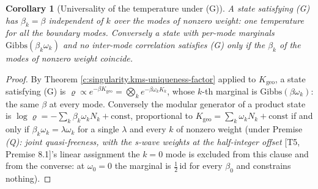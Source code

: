 \documentclass[11pt]{article}
\newtheorem{corollary}[theorem]{Corollary}
\theoremstyle{definition}
\theoremstyle{plain}
\begin{document}
\begin{corollary}[Universality of the temperature under (G)]\label{c:singularity.universality-temperature-under-g}
A state satisfying (G) has $\beta_k = \beta$ independent of $k$ over the modes of nonzero weight: one temperature for all the boundary modes. Conversely a state with per-mode marginals $\mathrm{Gibbs}(\beta_k\omega_k)$ and no inter-mode correlation satisfies (G) only if the $\beta_k$ of the modes of nonzero weight coincide.
\end{corollary}
\begin{proof}
By Theorem \ref{c:singularity.kms-uniqueness-factor} applied to $K_{\mathrm{geo}}$, a state satisfying (G) is $\varrho \propto e^{-\beta K_{\mathrm{geo}}} = \bigotimes_k e^{-\beta\omega_k K_k}$, whose $k$-th marginal is $\mathrm{Gibbs}(\beta\omega_k)$: the same $\beta$ at every mode. Conversely the modular generator of a product state is $\log\varrho = -\sum_k \beta_k\omega_k N_k + \mathrm{const}$, proportional to $K_{\mathrm{geo}} = \sum_k \omega_k N_k + \mathrm{const}$ if and only if $\beta_k\omega_k = \lambda\omega_k$ for a single $\lambda$ and every $k$ of nonzero weight (under Premise \emph{(Q): joint quasi-freeness, with the s-wave weights at the half-integer offset} [T5, Premise 8.1]'s linear assignment the $k = 0$ mode is excluded from this clause and from the converse: at $\omega_0 = 0$ the marginal is $\tfrac12\,\mathrm{id}$ for every $\beta_0$ and constrains nothing).

\end{proof}
\end{document}
